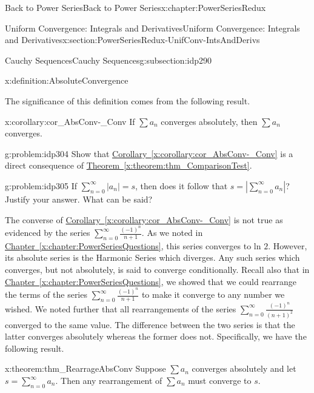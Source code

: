 \begin{chapterptx}{Back to Power Series}{}{Back to Power Series}{}{}{x:chapter:PowerSeriesRedux}
\begin{sectionptx}{Uniform Convergence: Integrals and Derivatives}{}{Uniform Convergence: Integrals and Derivatives}{}{}{x:section:PowerSeriesRedux-UnifConv-IntsAndDerivs}
\begin{subsectionptx}{Cauchy Sequences}{}{Cauchy Sequences}{}{}{g:subsection:idp290}
\begin{definition}{}{x:definition:AbsoluteConvergence}
			\end{definition}
			The significance of this definition comes from the following result.%
			\begin{corollary}{}{}{x:corollary:cor_AbsConv-_Conv}%
				If \(\sum a_n\) converges absolutely, then \(\sum a_n\) converges.%
			\end{corollary}
			\begin{problem}{}{g:problem:idp304}%
				 Show that \hyperref[x:corollary:cor_AbsConv-_Conv]{Corollary~{\xreffont\ref{x:corollary:cor_AbsConv-_Conv}}} is a direct consequence of \hyperref[x:theorem:thm_ComparisonTest]{Theorem~{\xreffont\ref{x:theorem:thm_ComparisonTest}}}.%
			\end{problem}
			\begin{problem}{}{g:problem:idp305}%
				 If \(\sum_{n=0}^\infty|a_n|=s\), then does it follow that \(s=|\sum_{n=0}^\infty a_n|\)? Justify your answer. What can be said?%
			\end{problem}
			The converse of \hyperref[x:corollary:cor_AbsConv-_Conv]{Corollary~{\xreffont\ref{x:corollary:cor_AbsConv-_Conv}}} is not true as evidenced by the series \(\sum_{n=0}^\infty\frac{(-1)^n}{n+1}\). As we noted in \hyperref[x:chapter:PowerSeriesQuestions]{Chapter~{\xreffont\ref{x:chapter:PowerSeriesQuestions}}}, this series converges to ln \(2\). However, its absolute series is the Harmonic  Series which diverges. Any such series which converges, but not absolutely, is said to \alert{converge conditionally}. Recall also that in \hyperref[x:chapter:PowerSeriesQuestions]{Chapter~{\xreffont\ref{x:chapter:PowerSeriesQuestions}}}, we showed that we could rearrange the terms of the series \(\sum_{n=0}^\infty\frac{(-1)^n}{n+1}\) to make it converge to any number we wished. We noted further that all rearrangements of the series \(\sum_{n=0}^\infty\frac{(-1)^n}{\left(n+1\right)^2}\) converged to the same value. The difference between the two series is that the latter converges absolutely whereas the former does not. Specifically, we have the following result.%
			\begin{theorem}{}{}{x:theorem:thm_RearrageAbsConv}%
				 Suppose \(\sum a_n\) converges absolutely and let \(s=\sum_{n=0}^\infty a_n\). Then any rearrangement of \(\sum a_n\) must converge to \(s\).%
			\end{theorem}

\end{subsectionptx}
\end{sectionptx}
\end{chapterptx}
